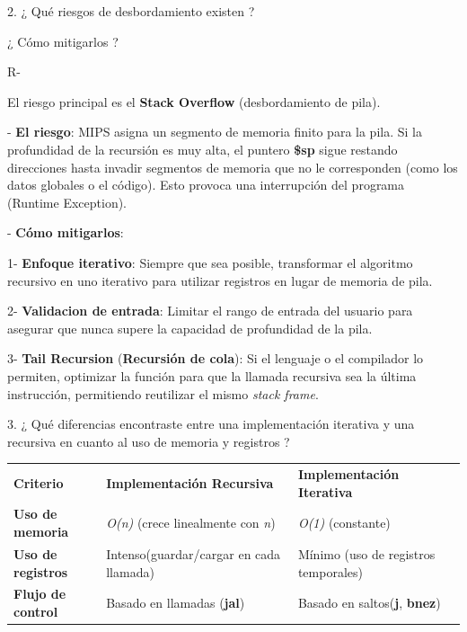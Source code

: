 \documentclass[
]{article}
\newcounter{none} %
\begin{document}
2. ¿ Qué riesgos de desbordamiento existen ?

¿ Cómo mitigarlos ?

R-

El riesgo principal es el \textbf{Stack Overflow} (desbordamiento de
pila).

- \textbf{El riesgo}: MIPS asigna un segmento de memoria finito para la
pila. Si la profundidad de la recursión es muy alta, el puntero
\textbf{\$sp} sigue restando direcciones hasta invadir segmentos de
memoria que no le corresponden (como los datos globales o el código).
Esto provoca una interrupción del programa (Runtime Exception).

- \textbf{Cómo mitigarlos}:

1- \textbf{Enfoque iterativo}: Siempre que sea posible, transformar el
algoritmo recursivo en uno iterativo para utilizar registros en lugar de
memoria de pila.

2- \textbf{Validacion de entrada}: Limitar el rango de entrada del
usuario para asegurar que nunca supere la capacidad de profundidad de la
pila.

3- \textbf{Tail Recursion} (\textbf{Recursión de cola}): Si el lenguaje
o el compilador lo permiten, optimizar la función para que la llamada
recursiva sea la última instrucción, permitiendo reutilizar el mismo
\emph{stack frame}.

3. ¿ Qué diferencias encontraste entre una implementación iterativa y
una recursiva en cuanto al uso de memoria y registros ?

{\def\LTcaptype{none} %
\begin{longtable}[]{@{}
  >{\raggedright\arraybackslash}p{}
  >{\raggedright\arraybackslash}p{}
  >{\raggedright\arraybackslash}p{}@{}}
\toprule\noalign{}
\endhead
\bottomrule\noalign{}
\endlastfoot
\textbf{Criterio} & \textbf{Implementación Recursiva} &
\textbf{Implementación Iterativa} \\
\textbf{Uso de memoria} & \emph{O(n)} (crece linealmente con \emph{n}) &
\emph{O(1)} (constante) \\
\textbf{Uso de registros} & Intenso(guardar/cargar en cada llamada) &
Mínimo (uso de registros temporales) \\
\textbf{Flujo de control} & Basado en llamadas (\textbf{jal}) & Basado
en saltos(\textbf{j}, \textbf{bnez}) \\
\end{longtable}
}
\end{document}
